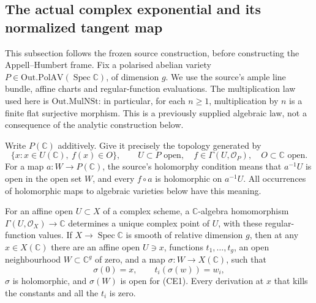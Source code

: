 \subsection{The actual complex exponential and its normalized tangent map}
\label{subsec:ftb-actual-complex-exponential}

This subsection follows the frozen source construction, before constructing the
Appell--Humbert frame.  Fix a polarised abelian variety
\(P\in\mathrm{Out.PolAV}(\operatorname{Spec}\mathbb C)\), of dimension \(g\).
We use the source's ample line bundle, affine charts and regular-function
evaluations.  The multiplication law used here is
\(\mathrm{Out.MulNSt}\): in particular, for each \(n\geq1\), multiplication
by \(n\) is a finite flat surjective morphism.  This is a previously supplied
algebraic law, not a consequence of the analytic construction below.

Write \(P(\mathbb C)\) additively.  Give it precisely the topology generated by
\[
 \{x:x\in U(\mathbb C),\ f(x)\in O\},
 \qquad U\subset P\text{ open},\quad f\in\Gamma(U,\mathcal O_P),
 \quad O\subset\mathbb C\text{ open}.                         \tag{CE1}
\]
For a map \(a:W\to P(\mathbb C)\), the source's holomorphy condition means that
\(a^{-1}U\) is open in the open set \(W\), and every
\(f\circ a\) is holomorphic on \(a^{-1}U\).  All occurrences of
holomorphic maps to algebraic varieties below have this meaning.

\begin{srlemma}
\label{lem:ftb-complex-algebraic-charts}
For an affine open \(U\subset X\) of a complex scheme, a
\(\mathbb C\)-algebra homomorphism
\(\Gamma(U,\mathcal O_X)\to\mathbb C\) determines a unique complex point of
\(U\), with these regular-function values.  If \(X\to\operatorname{Spec}\mathbb C\)
is smooth of relative dimension \(g\), then at any \(x\in X(\mathbb C)\)
there are an affine open \(U\ni x\), functions \(t_1,\ldots,t_g\), an open
neighbourhood \(W\subset\mathbb C^g\) of zero, and a map
\(\sigma:W\to X(\mathbb C)\), such that
\[
 \sigma(0)=x,\qquad t_i(\sigma(w))=w_i,                       \tag{CE2}
\]
\(\sigma\) is holomorphic, and \(\sigma(W)\) is open for (CE1).
Every derivation at \(x\) that kills the constants and all the \(t_i\)
is zero.
\end{srlemma}

